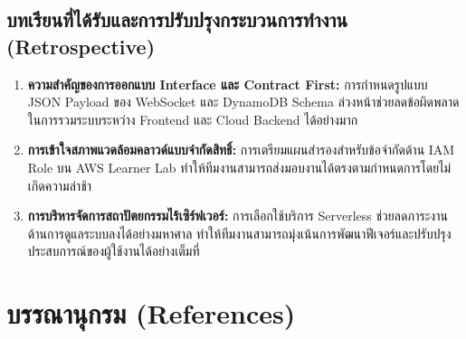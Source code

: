 \documentclass[12pt,a4paper]{report}
\begin{document}
\section{บทเรียนที่ได้รับและการปรับปรุงกระบวนการทำงาน (Retrospective)}
\begin{enumerate}
    \item \textbf{ความสำคัญของการออกแบบ Interface และ Contract First:} การกำหนดรูปแบบ JSON Payload ของ WebSocket และ DynamoDB Schema ล่วงหน้าช่วยลดข้อผิดพลาดในการรวมระบบระหว่าง Frontend และ Cloud Backend ได้อย่างมาก
    \item \textbf{การเข้าใจสภาพแวดล้อมคลาวด์แบบจำกัดสิทธิ์:} การเตรียมแผนสำรองสำหรับข้อจำกัดด้าน IAM Role บน AWS Learner Lab ทำให้ทีมงานสามารถส่งมอบงานได้ตรงตามกำหนดการโดยไม่เกิดความล่าช้า
    \item \textbf{การบริหารจัดการสถาปัตยกรรมไร้เซิร์ฟเวอร์:} การเลือกใช้บริการ Serverless ช่วยลดภาระงานด้านการดูแลระบบลงได้อย่างมหาศาล ทำให้ทีมงานสามารถมุ่งเน้นการพัฒนาฟีเจอร์และปรับปรุงประสบการณ์ของผู้ใช้งานได้อย่างเต็มที่
\end{enumerate}

\chapter*{บรรณานุกรม (References)}
\end{document}
